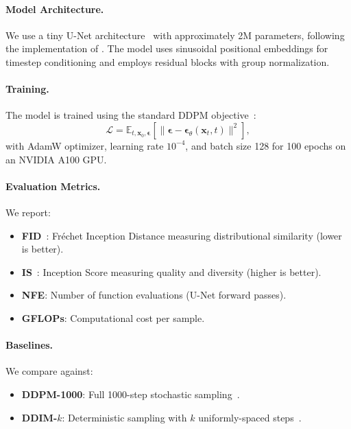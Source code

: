 \documentclass{article}
\begin{document}
\paragraph{Model Architecture.} We use a tiny U-Net architecture~\citep{ronneberger2015unet} with approximately 2M parameters, following the implementation of \citet{lucidrains2023diffusion}. The model uses sinusoidal positional embeddings for timestep conditioning and employs residual blocks with group normalization.

\paragraph{Training.} The model is trained using the standard DDPM objective~\citep{ho2020denoising}:
\begin{equation}
    \mathcal{L} = \mathbb{E}_{t, \mathbf{x}_0, \boldsymbol{\epsilon}}\left[\|\boldsymbol{\epsilon} - \boldsymbol{\epsilon}_\theta(\mathbf{x}_t, t)\|^2\right],
\end{equation}
with AdamW optimizer, learning rate $10^{-4}$, and batch size 128 for 100 epochs on an NVIDIA A100 GPU.

\paragraph{Evaluation Metrics.} We report:
\begin{itemize}
    \item \textbf{FID}~\citep{heusel2017gans}: Fréchet Inception Distance measuring distributional similarity (lower is better).
    \item \textbf{IS}~\citep{salimans2016improved}: Inception Score measuring quality and diversity (higher is better).
    \item \textbf{NFE}: Number of function evaluations (U-Net forward passes).
    \item \textbf{GFLOPs}: Computational cost per sample.
\end{itemize}

\paragraph{Baselines.} We compare against:
\begin{itemize}
    \item \textbf{DDPM-1000}: Full 1000-step stochastic sampling~\citep{ho2020denoising}.
    \item \textbf{DDIM-$k$}: Deterministic sampling with $k$ uniformly-spaced steps~\citep{song2020denoising}.
\end{itemize}
\end{document}
